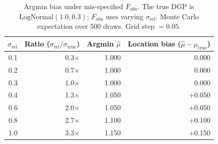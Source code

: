 \begin{table}[h]
    \centering
    \small
    \begin{tabular}{rrrr}
        \toprule
        $\sigma_\text{rel}$ & Ratio ($\sigma_\text{rel} / \sigma_\text{true}$) & Argmin $\hat{\mu}$ & Location bias ($\hat{\mu} - \mu_\text{true}$) \\
        \midrule
        0.1 & 0.3$\times$ & 1.000 & 0.000 \\
        0.2 & 0.7$\times$ & 1.000 & 0.000 \\
        0.3 & 1.0$\times$ & 1.000 & 0.000 \\
        0.4 & 1.3$\times$ & 1.050 & $+$0.050 \\
        0.6 & 2.0$\times$ & 1.050 & $+$0.050 \\
        0.8 & 2.7$\times$ & 1.100 & $+$0.100 \\
        1.0 & 3.3$\times$ & 1.150 & $+$0.150 \\
        \bottomrule
    \end{tabular}
    \caption{Argmin bias under mis-specified $F_\text{obs}$. The true DGP is $\text{LogNormal}(1.0, 0.3)$; $F_\text{obs}$ uses varying $\sigma_\text{rel}$. Monte Carlo expectation over 500 draws. Grid step $= 0.05$.}
    \label{tab:misspec}
\end{table}
